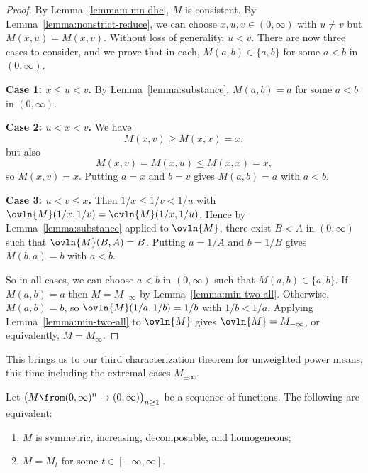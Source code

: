 \begin{proof}
By Lemma~\ref{lemma:u-mn-dhc}, $M$ is consistent.  By
Lemma~\ref{lemma:nonstrict-reduce}, we can choose $x, u, v \in (0, \infty)$
with $u \neq v$ but $M(x, u) = M(x, v)$.  Without loss of generality, $u <
v$.  There are now three cases to consider, and we prove that in each,
$M(a, b) \in \{a, b\}$ for some $a < b$ in $(0, \infty)$.

\textbf{Case 1: $x \leq u < v$.}  By Lemma~\ref{lemma:substance}, $M(a,
b) = a$ for some $a < b$ in $(0, \infty)$.

\textbf{Case 2: $u < x < v$.}  We have 
\[
M(x, v) \geq M(x, x) = x, 
\]
but also 
\[
M(x, v) = M(x, u) \leq M(x, x) = x,
\]
so $M(x, v) = x$. Putting $a = x$ and $b = v$ gives $M(a, b) = a$ with $a <
b$. 

\textbf{Case 3: $u < v \leq x$.}  Then $1/x \leq 1/v < 1/u$ with
$\ovln{M}(1/x, 1/v) = \ovln{M}(1/x, 1/u)$.  Hence by
Lemma~\ref{lemma:substance} applied to $\ovln{M}$, there exist $B < A$ in
$(0, \infty)$ such that $\ovln{M}(B, A) = B$.  Putting $a = 1/A$ and $b =
1/B$ gives $M(b, a) = b$ with $a < b$.

So in all cases, we can choose $a < b$ in $(0, \infty)$ such that $M(a, b)
\in \{a, b\}$.  If $M(a, b) = a$ then $M = M_{-\infty}$ by
Lemma~\ref{lemma:min-two-all}.  Otherwise, $M(a, b) = b$, so $\ovln{M}(1/a,
1/b) = 1/b$ with $1/b < 1/a$.  Applying Lemma~\ref{lemma:min-two-all} to
$\ovln{M}$ gives $\ovln{M} = M_{-\infty}$, or equivalently, $M = M_\infty$.
\end{proof}

This brings us to our third characterization theorem for unweighted power
means, this time including the extremal cases $M_{\pm\infty}$.  

\begin{thm}
% 
Let $\bigl(M \from (0, \infty)^n \to (0, \infty)\bigr)_{n \geq 1}$ be a
sequence of functions.  The following are equivalent:
% 
\begin{enumerate}
\item
{}
$M$ is symmetric, increasing, decomposable, and homogeneous;

\item
{}
$M = M_t$ for some $t \in [-\infty, \infty]$.
\end{enumerate}
\end{thm}

